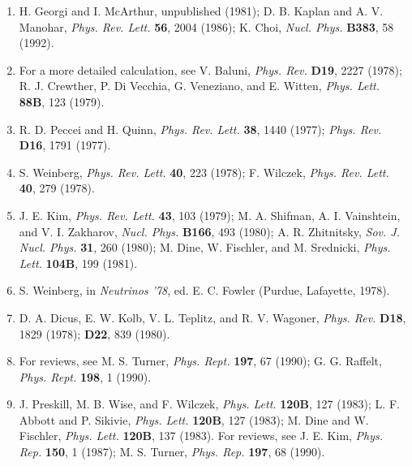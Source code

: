 \begin{enumerate}
\item {}\label{ch23-ref-28}
H. Georgi and I. McArthur, unpublished (1981); D. B. Kaplan and
A. V. Manohar, \emph{Phys. Rev. Lett.} \textbf{56}, 2004 (1986);
K. Choi, \emph{Nucl. Phys.} \textbf{B383}, 58 (1992).

\item {}\label{ch23-ref-29}
For a more detailed calculation, see V. Baluni, \emph{Phys. Rev.}
\textbf{D19}, 2227 (1978); R. J. Crewther, P. Di Vecchia,
G. Veneziano, and E. Witten, \emph{Phys. Lett.} \textbf{88B}, 123
(1979).

\item {}\label{ch23-ref-30}
R. D. Peccei and H. Quinn, \emph{Phys. Rev. Lett.} \textbf{38}, 1440
(1977); \emph{Phys. Rev.} \textbf{D16}, 1791 (1977).

\item {}\label{ch23-ref-31}
S. Weinberg, \emph{Phys. Rev. Lett.} \textbf{40}, 223 (1978);
F. Wilczek, \emph{Phys. Rev. Lett.} \textbf{40}, 279 (1978).

\item {}\label{ch23-ref-32}
J. E. Kim, \emph{Phys. Rev. Lett.} \textbf{43}, 103 (1979);
M. A. Shifman, A. I. Vainshtein, and V. I. Zakharov,
\emph{Nucl. Phys.} \textbf{B166}, 493 (1980); A. R. Zhitnitsky,
\emph{Sov. J. Nucl. Phys.} \textbf{31}, 260 (1980); M. Dine,
W. Fischler, and M. Srednicki, \emph{Phys. Lett.} \textbf{104B}, 199
(1981).

\item {}\label{ch23-ref-33}
S. Weinberg, in \emph{Neutrinos '78}, ed. E. C. Fowler (Purdue,
Lafayette, 1978).

\item {}\label{ch23-ref-34}
D. A. Dicus, E. W. Kolb, V. L. Teplitz, and R. V. Wagoner,
\emph{Phys. Rev.} \textbf{D18}, 1829 (1978); \textbf{D22}, 839 (1980).

\item {}\label{ch23-ref-35}
For reviews, see M. S. Turner, \emph{Phys. Rept.} \textbf{197}, 67
(1990); G. G. Raffelt, \emph{Phys. Rept.} \textbf{198}, 1 (1990).

\item {}\label{ch23-ref-36}
J. Preskill, M. B. Wise, and F. Wilczek, \emph{Phys. Lett.}
\textbf{120B}, 127 (1983); L. F. Abbott and P. Sikivie,
\emph{Phys. Lett.} \textbf{120B}, 127 (1983); M. Dine and W. Fischler,
\emph{Phys. Lett.} \textbf{120B}, 137 (1983). For reviews, see J. E. Kim,
\emph{Phys. Rep.} \textbf{150}, 1 (1987); M. S. Turner,
\emph{Phys. Rep.} \textbf{197}, 68 (1990).


\end{enumerate}

